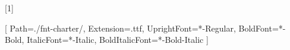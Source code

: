 
\usepackage{lipsum}
\usepackage[a4paper,top=2cm,bottom=2cm,inner=3cm,outer=1cm,marginparwidth=4cm]{geometry}
\usepackage{titlesec}
\usepackage{titling}
\usepackage{fontspec}
\usepackage{suffix}
\usepackage{multicol}
\usepackage{tikz}
\usepackage{pdflscape}
\usepackage{onimage} %
\usepackage{bm}
\usepackage{textcomp}
\usepackage{gensymb}
\usepackage{enumitem}

\usepackage{eso-pic}
\newcommand\PagePic[1]{%
	\put(0,0){%
		\parbox[b][\paperheight]{\paperwidth}{%
			\flushleft
			\texttt{[image: \#1]}%
			\vfill
}}}

\newcommand{\NewPicHeight}[2]{
\put(0,0){%
\parbox[b][\paperheight]{\paperwidth}{%
\vspace*{#2}
\flushright
\texttt{[image: \#1]}%
\vfill
}}}

\usepackage{xcolor}%

\usepackage{tocloft}
\renewcommand{\cftchapfont}{\color{clrt1}}
\renewcommand{\cftsecfont}{\color{clrt2}}

\newcommand\chapterauthor[5]{\authortoc{#1}{#4}{#5}\noindent\printchapterauthor{#1}{#2}{#3}}
\WithSuffix\newcommand\chapterauthor*[1]{}

\makeatletter
\newcommand{\printchapterauthor}[3]{
  {\large#1$^{~\small\textnormal#2}$#3}
  \@afterheading
}

\newcommand{\authortoc}[3]{
  \addtocontents{toc}{\hspace{#2em}}
  \addtocontents{toc}{
    {\protect\scriptsize\textcolor{black}{#1#3}}{}{}
    }
}

\setmainfont{Charter}[
  Path=./fnt-charter/,
  Extension=.ttf,
  UprightFont=*-Regular,
  BoldFont=*-Bold,
  ItalicFont=*-Italic,
  BoldItalicFont=*-Bold-Italic
]

\usepackage{titling}
\setlength\fboxsep{.6em}
\setlength{\parskip}{.8em} %
\setlength{\parindent}{0em} %
\renewcommand{\baselinestretch}{1.2} 


